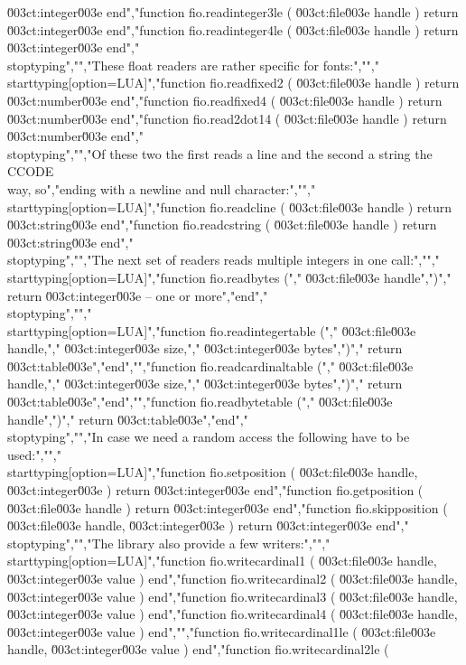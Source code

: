 \u003ct:integer\u003e end","function fio.readinteger3le ( \u003ct:file\u003e handle ) return \u003ct:integer\u003e end","function fio.readinteger4le ( \u003ct:file\u003e handle ) return \u003ct:integer\u003e end","\\stoptyping","","These float readers are rather specific for fonts:","","\\starttyping[option=LUA]","function fio.readfixed2 ( \u003ct:file\u003e handle ) return \u003ct:number\u003e  end","function fio.readfixed4 ( \u003ct:file\u003e handle ) return \u003ct:number\u003e  end","function fio.read2dot14 ( \u003ct:file\u003e handle ) return \u003ct:number\u003e  end","\\stoptyping","","Of these two the first reads a line and the second a string the \\CCODE\\ way, so","ending with a newline and null character:","","\\starttyping[option=LUA]","function fio.readcline   ( \u003ct:file\u003e handle ) return \u003ct:string\u003e end","function fio.readcstring ( \u003ct:file\u003e handle ) return \u003ct:string\u003e end","\\stoptyping","","The next set of readers reads multiple integers in one call:","","\\starttyping[option=LUA]","function fio.readbytes (","    \u003ct:file\u003e handle",")","    return \u003ct:integer\u003e -- one or more","end","\\stoptyping","","\\starttyping[option=LUA]","function fio.readintegertable (","    \u003ct:file\u003e    handle,","    \u003ct:integer\u003e size,","    \u003ct:integer\u003e bytes",")","    return \u003ct:table\u003e","end","","function fio.readcardinaltable (","    \u003ct:file\u003e    handle,","    \u003ct:integer\u003e size,","    \u003ct:integer\u003e bytes",")","    return \u003ct:table\u003e","end","","function fio.readbytetable (","    \u003ct:file\u003e handle",")","    return \u003ct:table\u003e","end","\\stoptyping","","In case we need a random access the following have to be used:","","\\starttyping[option=LUA]","function fio.setposition  ( \u003ct:file\u003e handle, \u003ct:integer\u003e ) return \u003ct:integer\u003e end","function fio.getposition  ( \u003ct:file\u003e handle              ) return \u003ct:integer\u003e end","function fio.skipposition ( \u003ct:file\u003e handle, \u003ct:integer\u003e ) return \u003ct:integer\u003e end","\\stoptyping","","The library also provide a few writers:","","\\starttyping[option=LUA]","function fio.writecardinal1 ( \u003ct:file\u003e handle, \u003ct:integer\u003e value ) end","function fio.writecardinal2 ( \u003ct:file\u003e handle, \u003ct:integer\u003e value ) end","function fio.writecardinal3 ( \u003ct:file\u003e handle, \u003ct:integer\u003e value ) end","function fio.writecardinal4 ( \u003ct:file\u003e handle, \u003ct:integer\u003e value ) end","","function fio.writecardinal1le ( \u003ct:file\u003e handle, \u003ct:integer\u003e value ) end","function fio.writecardinal2le ( 